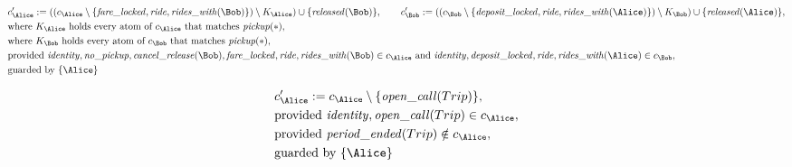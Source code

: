 \begin{align*}
&
c'_
{
\Alice
}
 := 
(
(c_
{
\Alice
}
 \setminus 
\{
\mathit{\detokenize{
fare_locked
}}
,
\mathit{\detokenize{
ride
}}
,
\mathit{\detokenize{
rides_with
}}
(
\Bob
)
\}
) \setminus K_
{
\Alice
}
) \cup 
\{
\mathit{\detokenize{
released
}}
(
\Bob
)
\}
, \qquad 
c'_
{
\Bob
}
 := 
(
(c_
{
\Bob
}
 \setminus 
\{
\mathit{\detokenize{
deposit_locked
}}
,
\mathit{\detokenize{
ride
}}
,
\mathit{\detokenize{
rides_with
}}
(
\Alice
)
\}
) \setminus K_
{
\Bob
}
) \cup 
\{
\mathit{\detokenize{
released
}}
(
\Alice
)
\}
,\\
&
\text{where } K_
{
\Alice
}
 \text{ holds every atom of } c_
{
\Alice
}
 \text{ that matches } 
\mathit{\detokenize{
pickup
}}
(
\ast
)
,\\
&
\text{where } K_
{
\Bob
}
 \text{ holds every atom of } c_
{
\Bob
}
 \text{ that matches } 
\mathit{\detokenize{
pickup
}}
(
\ast
)
,\\
&
\text{provided } 
\mathit{\detokenize{
identity
}}
,
\mathit{\detokenize{
no_pickup
}}
,
\mathit{\detokenize{
cancel_release
}}
(
\Bob
)
,
\mathit{\detokenize{
fare_locked
}}
,
\mathit{\detokenize{
ride
}}
,
\mathit{\detokenize{
rides_with
}}
(
\Bob
)
 \in c_
{
\Alice
}
 \text{ and } 
\mathit{\detokenize{
identity
}}
,
\mathit{\detokenize{
deposit_locked
}}
,
\mathit{\detokenize{
ride
}}
,
\mathit{\detokenize{
rides_with
}}
(
\Alice
)
 \in c_
{
\Bob
}
,\\
&
\text{guarded by } \{
\Alice
\}
\end{align*}

\begin{align*}
&
c'_
{
\Alice
}
 := 
c_
{
\Alice
}
 \setminus 
\{
\mathit{\detokenize{
open_call
}}
(
Trip
)
\}
,\\
&
\text{provided } 
\mathit{\detokenize{
identity
}}
,
\mathit{\detokenize{
open_call
}}
(
Trip
)
 \in c_
{
\Alice
}
,\\
&
\text{provided } 
\mathit{\detokenize{
period_ended
}}
(
Trip
)
 \notin c_
{
\Alice
}
,\\
&
\text{guarded by } \{
\Alice
\}
\end{align*}
